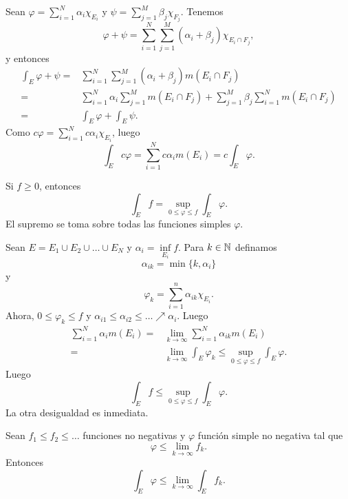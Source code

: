     \begin{demo}
    Sean $\varphi=\sum\limits_{i=1}^N \alpha_i \chi_{E_i}$ y $\psi=\sum\limits_{j=1}^M \beta_j \chi_{F_j}$. 
    Tenemos 
    \[
    \varphi+\psi=
    \sum\limits_{i=1}^N\sum\limits_{j=1}^M (\alpha_i+\beta_j) \chi_{E_i \cap F_j},
    \]
    y entonces
    \[
    \begin{split}
    \int_E \varphi+\psi=& 
    \sum\limits_{i=1}^N\sum\limits_{j=1}^M (\alpha_i+\beta_j) m(E_i \cap F_j)
    \\
    =&\sum\limits_{i=1}^N \alpha_i \sum\limits_{j=1}^M m(E_i \cap F_j)+
    \sum\limits_{j=1}^M \beta_j \sum\limits_{i=1}^N m(E_i \cap F_j)
    \\
    =&\int_E \varphi +\int_E \psi.
    \end{split}
        \]
    Como $c\varphi=\sum\limits_{i=1}^N c \alpha_i \chi_{E_i}$, luego
    \[
    \int_E c\varphi = \sum\limits_{i=1}^N c\alpha_i m(E_i)=c\int_E \varphi.
    \]
    \end{demo}
    
    \begin{teorema}{}
    Si $f\geq 0$, entonces
    \[\int_E f = \sup\limits_{0\leq \varphi\leq f} \int_E \varphi.\]
    El supremo se toma sobre todas las funciones simples $\varphi$.
    
    \end{teorema}
    
    \begin{demo}
    Sean $E=E_1\cup E_2\cup\ldots \cup E_N$ y $\alpha_i=\inf\limits_{E_i} f$. Para $k\in \mathbb{N}$ definamos 
    \[\alpha_{ik}=\min\{k,\alpha_i\}\]
    y 
    \[ \varphi_k=\sum\limits_{i=1}^n \alpha_{ik} \chi_{E_i}.\]
    Ahora, $0\leq \varphi_k \leq f$ y $\alpha_{i1}\leq \alpha_{i2}\leq \ldots \nearrow \alpha_i$. 
    Luego 
    \[
    \begin{split}
    \sum\limits_{i=1}^N \alpha_i m(E_i)=&
    \lim\limits_{k \to \infty} \sum\limits_{i=1}^N \alpha_{ik} m(E_i)
    \\
    =&\lim\limits_{k \to \infty} \int_E \varphi_k 
     \leq  \sup\limits_{0\leq \varphi \leq f} \int_E \varphi.
    \end{split}
    \]
    Luego
    \[
    \int_E f \leq \sup\limits_{0\leq \varphi \leq f} \int_E \varphi.
    \]    
    La otra desigualdad es inmediata.
    \end{demo}
    
    
    \begin{lema}{}
    Sean $f_1\leq f_2\leq \ldots$ funciones no negativas y $\varphi$ funci\'on simple no negativa tal que 
    \[
    \varphi \leq \lim\limits_{k \to \infty} f_k.
    \]
   Entonces  
        \[
    \int_E\varphi \leq \lim\limits_{k \to \infty} \int_Ef_k.
    \]
   
    \end{lema}
    
